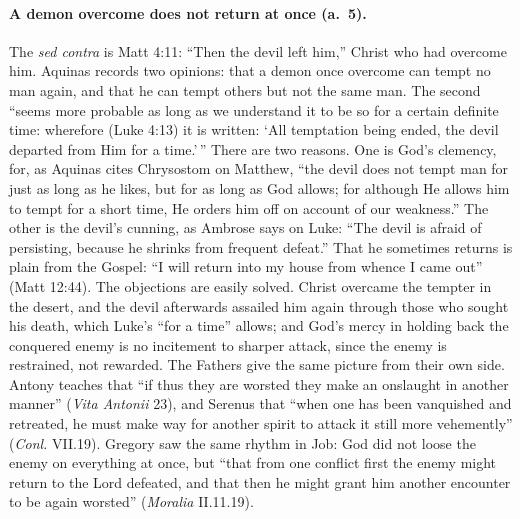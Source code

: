 \paragraph{A demon overcome does not return at once (a.~5).} The \emph{sed
contra} is Matt 4:11: ``Then the devil left him,'' Christ who had overcome
him. Aquinas records two opinions: that a demon once overcome can tempt no
man again, and that he can tempt others but not the same man. The second
``seems more probable as long as we understand it to be so for a certain
definite time: wherefore (Luke 4:13) it is written: `All temptation being
ended, the devil departed from Him for a time.'\,'' There are two reasons.
One is God's clemency, for, as Aquinas cites Chrysostom on Matthew, ``the devil does not tempt man for
just as long as he likes, but for as long as God allows; for although He
allows him to tempt for a short time, He orders him off on account of our
weakness.'' The other is the devil's cunning, as Ambrose says on Luke:
``The devil is afraid of persisting, because he shrinks from frequent
defeat.'' That he sometimes returns is plain from the Gospel: ``I will
return into my house from whence I came out'' (Matt 12:44). The objections
are easily solved. Christ overcame the tempter in the desert, and the
devil afterwards assailed him again through those who sought his death,
which Luke's ``for a time'' allows; and God's mercy in holding back the
conquered enemy is no incitement to sharper attack, since the enemy is
restrained, not rewarded. The Fathers give the same picture from their own
side. Antony teaches that ``if thus they are worsted they make an onslaught
in another manner'' (\emph{Vita Antonii} 23), and Serenus that ``when one
has been vanquished and retreated, he must make way for another spirit to
attack it still more vehemently'' (\emph{Conl.} VII.19). Gregory saw the
same rhythm in Job: God did not loose the enemy on everything at once, but
``that from one conflict first the enemy might return to the Lord defeated,
and that then he might grant him another encounter to be again worsted''
(\emph{Moralia} II.11.19).

